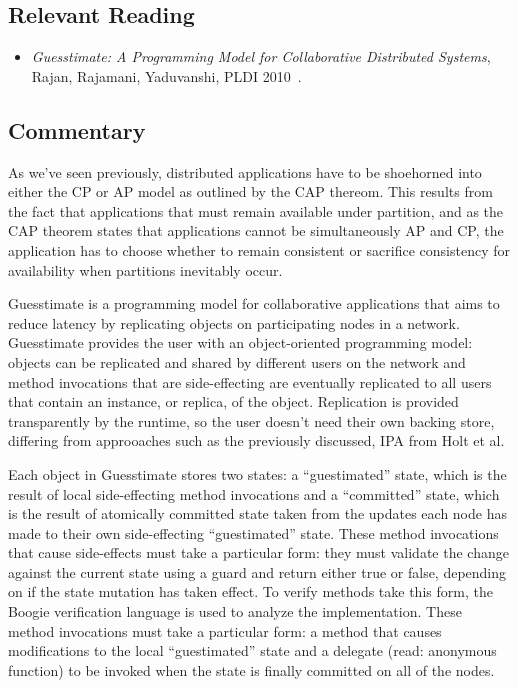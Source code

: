 \subsection{Relevant Reading}

\begin{itemize}
	\item \textit{Guesstimate: A Programming Model for Collaborative Distributed Systems}, Rajan, Rajamani, Yaduvanshi, PLDI 2010~\cite{rajan2010guesstimate}.
\end{itemize}

\subsection{Commentary}

As we've seen previously, distributed applications have to be shoehorned into either the CP or AP model as outlined by the CAP thereom.  This results from the fact that applications that must remain available under partition, and as the CAP theorem states that applications cannot be simultaneously AP and CP, the application has to choose whether to remain consistent or sacrifice consistency for availability when partitions inevitably occur.

Guesstimate is a programming model for collaborative applications that aims to reduce latency by replicating objects on participating nodes in a network.  Guesstimate provides the user with an object-oriented programming model: objects can be replicated and shared by different users on the network and method invocations that are side-effecting are eventually replicated to all users that contain an instance, or replica, of the object.  Replication is provided transparently by the runtime, so the user doesn't need their own backing store, differing from approoaches such as the previously discussed, IPA from Holt et al.

Each object in Guesstimate stores two states: a ``guestimated'' state, which is the result of local side-effecting method invocations and a ``committed'' state, which is the result of atomically committed state taken from the updates each node has made to their own side-effecting ``guestimated'' state.  These method invocations that cause side-effects must take a particular form: they must validate the change against the current state using a guard and return either true or false, depending on if the state mutation has taken effect.  To verify methods take this form, the Boogie verification language is used to analyze the implementation.  These method invocations must take a particular form: a method that causes modifications to the local ``guestimated'' state and a delegate (read: anonymous function) to be invoked when the state is finally committed on all of the nodes.

